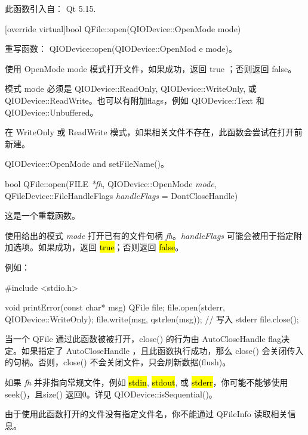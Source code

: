 此函数引入自： Qt 5.15.

[override virtual]bool QFile::open(QIODevice::OpenMode mode)

重写函数： QIODevice::open(QIODevice::OpenMod
e mode)。

使用 OpenMode mode 模式打开文件，如果成功，返回 true ；否则返回 false。

模式 mode 必须是 QIODevice::ReadOnly, QIODevice::WriteOnly, 或 QIODevice::ReadWrite。也可以有附加flags，例如 QIODevice::Text 和 QIODevice::Unbuffered。

\begin{notice}
在 WriteOnly 或 ReadWrite 模式，如果相关文件不存在，此函数会尝试在打开前新建。
\end{notice} 



\begin{seeAlso}
QIODevice::OpenMode and setFileName()。
\end{seeAlso} 

bool QFile::open(FILE \emph{*fh}, QIODevice::OpenMode \emph{mode}, QFileDevice::FileHandleFlags \emph{handleFlags} = DontCloseHandle)

这是一个重载函数。

使用给出的模式 \emph{mode} 打开已有的文件句柄 \emph{fh}。\emph{handleFlags} 可能会被用于指定附加选项。如果成功，返回 \hl{true}；否则返回 \hl{false}。

例如：


\begin{cppcode}
#include <stdio.h>

void printError(const char* msg)
{
    QFile file;
    file.open(stderr, QIODevice::WriteOnly);
    file.write(msg, qstrlen(msg));        // 写入 stderr
    file.close();
}
\end{cppcode}

当一个 QFile 通过此函数被被打开，close() 的行为由 AutoCloseHandle flag决定。如果指定了 AutoCloseHandle ，且此函数执行成功，那么 close() 会关闭传入的句柄。否则，close() 不会关闭文件，只会刷新数据(flush)。

\begin{warning}

\end{warning} 

\begin{compactitem}
\item 如果 \emph{fh} 并非指向常规文件，例如 \hl{stdin}, \hl{stdout}, 或 \hl{stderr}，你可能不能够使用 seek()，且size() 返回0。详见 QIODevice::isSequential()。
\item 由于使用此函数打开的文件没有指定文件名，你不能通过 QFileInfo 读取相关信息。
\end{compactitem}

